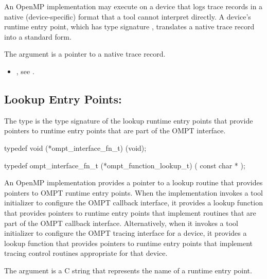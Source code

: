 \descr
An OpenMP implementation may execute on a device that logs trace 
records in a native (device-specific) format that a tool cannot
interpret directly. A device's  runtime 
entry point, which has type signature , 
translates a native trace record into a standard form.

\argdesc
The  argument is a pointer to a native trace record.

\crossreferences
\begin{itemize}
\item {}, see .
\end{itemize}



\subsection{Lookup Entry Points: }
\label{sec:ompt_function_lookup_t}
\label{sec:ompt_function_lookup}

\summary
The  type is the type signature of the 
lookup runtime entry points that provide pointers to runtime entry 
points that are part of the OMPT interface.

\format
\begin{ccppspecific}
\begin{omptInquiry}
typedef void (*ompt_interface_fn_t) (void);

typedef ompt_interface_fn_t (*ompt_function_lookup_t) (
  const char *
);
\end{omptInquiry}
\end{ccppspecific}

\descr
An OpenMP implementation provides a pointer to a lookup routine that 
provides pointers to OMPT runtime entry points. When the implementation 
invokes a tool initializer to configure the OMPT callback interface, it 
provides a lookup function that provides pointers to runtime entry points 
that implement routines that are part of the OMPT callback interface. 
Alternatively, when it invokes a tool initializer to configure the OMPT 
tracing interface for a device, it provides a lookup function that provides
pointers to runtime entry points that implement tracing control routines 
appropriate for that device.

\argdesc
The  argument is a C string that represents 
the name of a runtime entry point.

